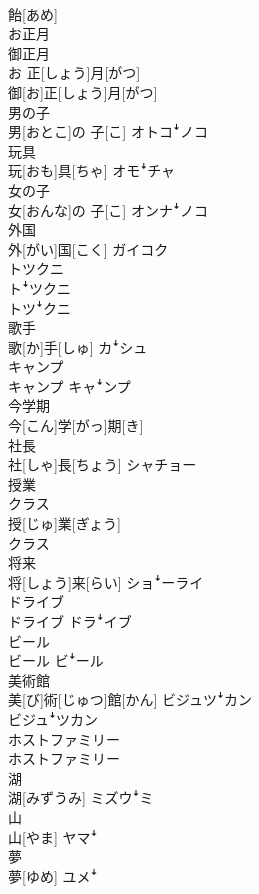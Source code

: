 \documentclass[8pt]{extreport}
\begin{document}
\begin{CJK}{UTF8}{min}
\\	飴[あめ]	
\\	お正月 
\\	御正月	
\\	お 正[しょう]月[がつ] 
\\	御[お]正[しょう]月[がつ]	
\\	男の子	
\\	男[おとこ]の 子[こ]	オトコꜜノコ
\\	玩具	
\\	玩[おも]具[ちゃ]	オモꜜチャ
\\	女の子	
\\	女[おんな]の 子[こ]	オンナꜜノコ
\\	外国	
\\	外[がい]国[こく]	ガイコク 
\\	トツクニ 
\\	トꜜツクニ 
\\	トツꜜクニ
\\	歌手	
\\	歌[か]手[しゅ]	カꜜシュ
\\	キャンプ	
\\	キャンプ	キャꜜンプ
\\	今学期	
\\	今[こん]学[がっ]期[き]	
\\	社長	
\\	社[しゃ]長[ちょう]	シャチョー
\\	授業 
\\	クラス	
\\	授[じゅ]業[ぎょう] 
\\	クラス	
\\	将来	
\\	将[しょう]来[らい]	ショꜜーライ
\\	ドライブ	
\\	ドライブ	ドラꜜイブ
\\	ビール	
\\	ビール	ビꜜール
\\	美術館	
\\	美[び]術[じゅつ]館[かん]	ビジュツꜜカン 
\\	ビジュꜜツカン
\\	ホストファミリー	
\\	ホストファミリー	
\\	湖	
\\	湖[みずうみ]	ミズウꜜミ
\\	山	
\\	山[やま]	ヤマꜜ
\\	夢	
\\	夢[ゆめ]	ユメꜜ

\end{CJK}
\end{document}

